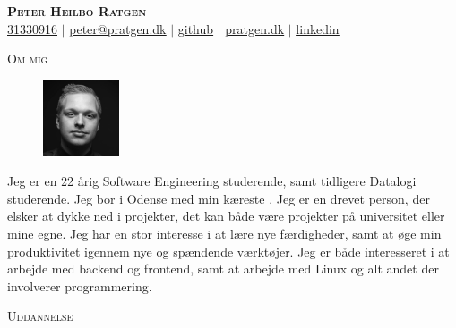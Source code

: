 \documentclass[11pt]{article}
\begin{document}
\begin{center}
  \textbf{\huge{\scshape{Peter Heilbo Ratgen}}}\\ 
  \vspace{0.2cm}
  \small \href{tel:+4531330916}{31330916} $|$
  \href{mailto:peter@pratgen.dk}{\underline{peter@pratgen.dk}} $|$
  \href{https://github.com/PeterRatgen }{\underline{github}} $|$
  \href{https://pratgen.dk}{\underline{pratgen.dk}} $|$
  \href{https://www.linkedin.com/in/peter-ratgen-a1236529/}{\underline{linkedin}}
\end{center}

\noindent\large{\scshape{Om mig}} \newline
\noindent{\rule[0.3cm]{\textwidth}{0.4pt}}

\begin{figure}
  \vspace{-0.7cm}
  \includegraphics[width=0.2\textwidth, right]{./okay.jpg}
\end{figure}
\normalsize Jeg er en 22 årig Software Engineering studerende, samt tidligere Datalogi
studerende. Jeg bor i Odense med min kæreste . Jeg er en drevet person, der
elsker at dykke ned i projekter, det kan både være projekter på universitet
eller mine egne. Jeg har en stor interesse i at lære nye færdigheder, samt at
øge min produktivitet igennem nye og spændende værktøjer. Jeg er både
interesseret i at arbejde med backend og frontend, samt at arbejde med Linux og
alt andet der involverer programmering.

\vspace{0.3cm}
\noindent\large{\scshape{Uddannelse}} \newline
\noindent{\rule[0.3cm]{\textwidth}{0.4pt}}
\end{document}
